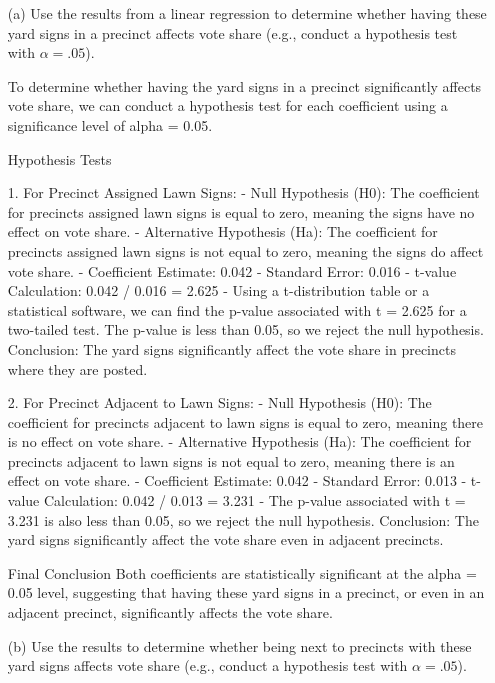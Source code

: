 \documentclass[12pt,letterpaper]{article}
\begin{document}
\vspace{.5cm}
	\newpage		
\begin{enumerate}
	\item [(a)] Use the results from a linear regression to determine whether having these yard signs in a precinct affects vote share (e.g., conduct a hypothesis test with $\alpha = .05$).
	
	To determine whether having the yard signs in a precinct significantly affects vote share, we can conduct a hypothesis test for each coefficient using a significance level of alpha = 0.05.
	
	Hypothesis Tests
	
	1. For Precinct Assigned Lawn Signs:
	- Null Hypothesis (H0): The coefficient for precincts assigned lawn signs is equal to zero, meaning the signs have no effect on vote share.
	- Alternative Hypothesis (Ha): The coefficient for precincts assigned lawn signs is not equal to zero, meaning the signs do affect vote share.
	- Coefficient Estimate: 0.042
	- Standard Error: 0.016
	- t-value Calculation: 0.042 / 0.016 = 2.625
	- Using a t-distribution table or a statistical software, we can find the p-value associated with t = 2.625 for a two-tailed test. The p-value is less than 0.05, so we reject the null hypothesis. Conclusion: The yard signs significantly affect the vote share in precincts where they are posted.
	
	2. For Precinct Adjacent to Lawn Signs:
	- Null Hypothesis (H0): The coefficient for precincts adjacent to lawn signs is equal to zero, meaning there is no effect on vote share.
	- Alternative Hypothesis (Ha): The coefficient for precincts adjacent to lawn signs is not equal to zero, meaning there is an effect on vote share.
	- Coefficient Estimate: 0.042
	- Standard Error: 0.013
	- t-value Calculation: 0.042 / 0.013 = 3.231
	- The p-value associated with t = 3.231 is also less than 0.05, so we reject the null hypothesis. Conclusion: The yard signs significantly affect the vote share even in adjacent precincts.
	
	Final Conclusion
	Both coefficients are statistically significant at the alpha = 0.05 level, suggesting that having these yard signs in a precinct, or even in an adjacent precinct, significantly affects the vote share.
	
		\vspace{1cm}
	

	\item [(b)]  Use the results to determine whether being
	next to precincts with these yard signs affects vote
	share (e.g., conduct a hypothesis test with $\alpha = .05$).
	

\end{enumerate}
\end{document}
